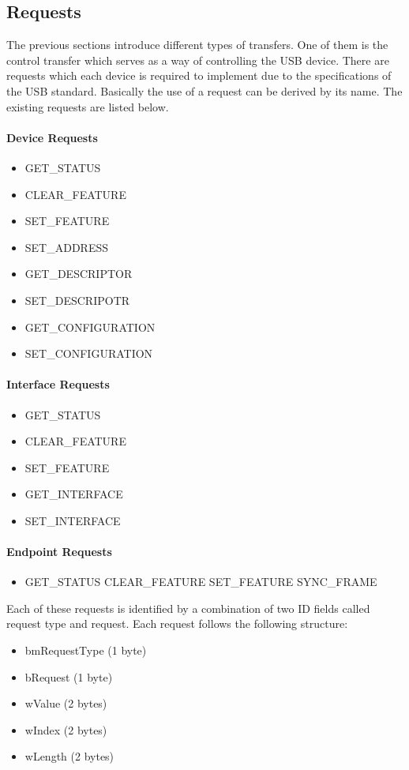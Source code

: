 \subsection{Requests}
The previous sections introduce different types of transfers. One of them is the control transfer which serves as a way of controlling the USB device. There are requests which each device is required to implement due to the specifications of the USB standard. Basically the use of a request can be derived by its name. The existing requests are listed below.
\paragraph{Device Requests}
\begin{itemize}
 \item GET\_STATUS
 \item CLEAR\_FEATURE
 \item SET\_FEATURE
 \item SET\_ADDRESS
 \item GET\_DESCRIPTOR
 \item SET\_DESCRIPOTR
 \item GET\_CONFIGURATION
 \item SET\_CONFIGURATION
\end{itemize}

\paragraph{Interface Requests}
\begin{itemize}
 \item GET\_STATUS
 \item CLEAR\_FEATURE
 \item SET\_FEATURE
 \item GET\_INTERFACE
 \item SET\_INTERFACE
\end{itemize}

\paragraph{Endpoint Requests}
\begin{itemize}
 \item GET_STATUS
CLEAR_FEATURE
SET_FEATURE
SYNC_FRAME
\end{itemize}

Each of these requests is identified by a combination of two ID fields called request type and request. Each request follows the following structure:
\begin{itemize}
 \item bmRequestType (1 byte)
 \item bRequest (1 byte)
 \item wValue (2 bytes)
 \item wIndex (2 bytes)
 \item wLength (2 bytes)
\end{itemize}

